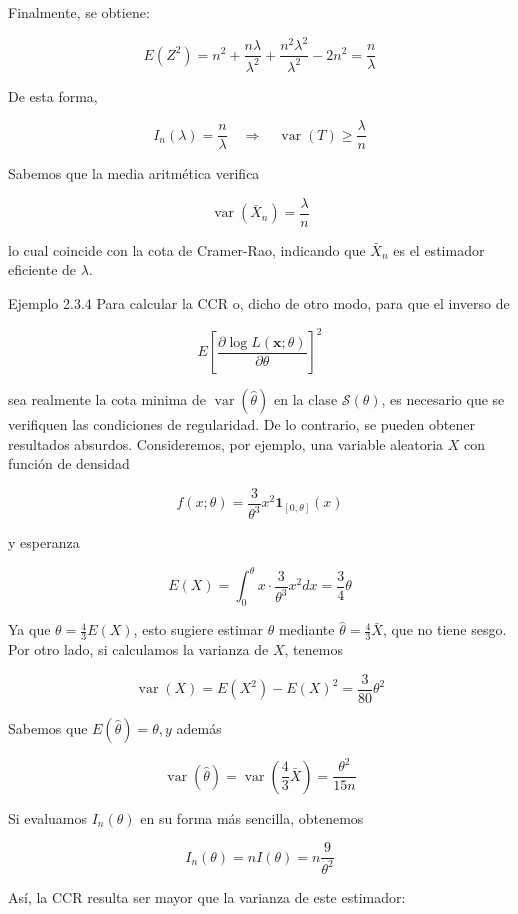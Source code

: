 \documentclass[
]{article}
\begin{document}
Finalmente, se obtiene:

\[
E\left(Z^{2}\right)=n^{2}+\frac{n \lambda}{\lambda^{2}}+\frac{n^{2} \lambda^{2}}{\lambda^{2}}-2 n^{2}=\frac{n}{\lambda}
\]

De esta forma,

\[
I_{n}(\lambda)=\frac{n}{\lambda} \quad \Longrightarrow \quad \operatorname{var}(T) \geq \frac{\lambda}{n}
\]

Sabemos que la media aritmética verifica

\[
\operatorname{var}\left(\bar{X}_{n}\right)=\frac{\lambda}{n}
\]

lo cual coincide con la cota de Cramer-Rao, indicando que \(\bar{X}_{n}\) es el estimador eficiente de \(\lambda\).

Ejemplo 2.3.4 Para calcular la CCR o, dicho de otro modo, para que el inverso de

\[
E\left[\frac{\partial \log L(\mathbf{x} ; \theta)}{\partial \theta}\right]^{2}
\]

sea realmente la cota minima de \(\operatorname{var}(\widehat{\theta})\) en la clase \(\mathcal{S}(\theta)\), es necesario que se verifiquen las condiciones de regularidad. De lo contrario, se pueden obtener resultados absurdos.
Consideremos, por ejemplo, una variable aleatoria \(X\) con función de densidad

\[
f(x ; \theta)=\frac{3}{\theta^{3}} x^{2} \mathbf{1}_{[0, \theta]}(x)
\]

y esperanza

\[
E(X)=\int_{0}^{\theta} x \cdot \frac{3}{\theta^{3}} x^{2} d x=\frac{3}{4} \theta
\]

Ya que \(\theta=\frac{4}{3} E(X)\), esto sugiere estimar \(\theta\) mediante \(\widehat{\theta}=\frac{4}{3} \bar{X}\), que no tiene sesgo.
Por otro lado, si calculamos la varianza de \(X\), tenemos

\[
\operatorname{var}(X)=E\left(X^{2}\right)-E(X)^{2}=\frac{3}{80} \theta^{2}
\]

Sabemos que \(E(\widehat{\theta})=\theta, y\) además

\[
\operatorname{var}(\widehat{\theta})=\operatorname{var}\left(\frac{4}{3} \bar{X}\right)=\frac{\theta^{2}}{15 n}
\]

Si evaluamos \(I_{n}(\theta)\) en su forma más sencilla, obtenemos

\[
I_{n}(\theta)=n I(\theta)=n \frac{9}{\theta^{2}}
\]

Así, la CCR resulta ser mayor que la varianza de este estimador:
\end{document}
